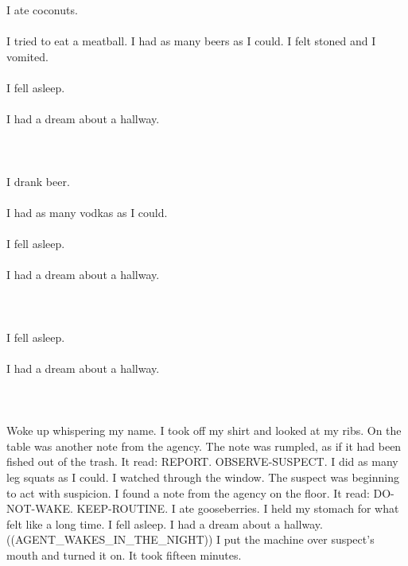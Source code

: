 \documentclass{article}
\begin{document}
    \section{}
    I ate coconuts.\\\\I tried to eat a meatball. I had as many beers as I could. I felt stoned and I vomited.\\\\I fell asleep.\\\\I had a dream about a hallway.\\\\ 
    \newpage
    
    \section{}
    I drank beer.\\\\I had as many vodkas as I could.\\\\I fell asleep.\\\\I had a dream about a hallway.\\\\ 
    \newpage
    
    \section{}
    I fell asleep.\\\\I had a dream about a hallway.\\\\ 
    \newpage
    
    \section{}
    Woke up whispering my name. I took off my shirt and looked at my ribs. On the table was another note from the agency. The note was rumpled, as if it had been fished out of the trash. It read: REPORT. OBSERVE-SUSPECT. I did as many leg squats as I could. I watched through the window. The suspect was beginning to act with suspicion. I found a note from the agency on the floor. It read: DO-NOT-WAKE. KEEP-ROUTINE. I ate gooseberries. I held my stomach for what felt like a long time. I fell asleep. I had a dream about a hallway. ((AGENT_WAKES_IN_THE_NIGHT)) I put the machine over suspect's mouth and turned it on. It took fifteen minutes. \\\\
    \newpage
    
\end{document}
